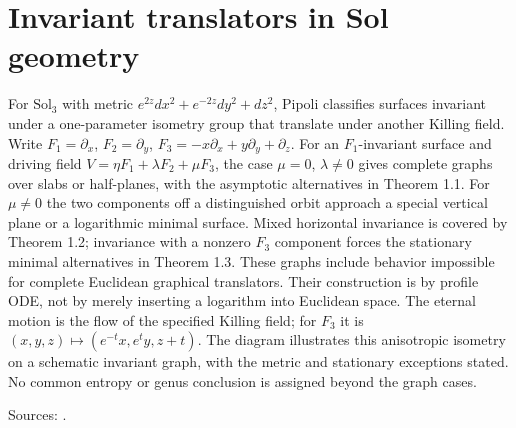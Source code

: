 \chapter{Invariant translators in Sol geometry}\label{sec:catalogue-sol-invariant-translators}
\begin{example}\label{ex:catalogue-sol-invariant-translators}
For $\mathrm{Sol}_3$ with metric $e^{2z}dx^2+e^{-2z}dy^2+dz^2$, Pipoli classifies surfaces invariant under a one-parameter isometry group that translate under another Killing field. Write $F_1=\partial_x$, $F_2=\partial_y$, $F_3=-x\partial_x+y\partial_y+\partial_z$. For an $F_1$-invariant surface and driving field $V=\eta F_1+\lambda F_2+\mu F_3$, the case $\mu=0$, $\lambda\ne0$ gives complete graphs over slabs or half-planes, with the asymptotic alternatives in Theorem 1.1. For $\mu\ne0$ the two components off a distinguished orbit approach a special vertical plane or a logarithmic minimal surface. Mixed horizontal invariance is covered by Theorem 1.2; invariance with a nonzero $F_3$ component forces the stationary minimal alternatives in Theorem 1.3.
These graphs include behavior impossible for complete Euclidean graphical translators. Their construction is by profile ODE, not by merely inserting a logarithm into Euclidean space. The eternal motion is the flow of the specified Killing field; for $F_3$ it is $(x,y,z)\mapsto(e^{-t}x,e^ty,z+t)$. The diagram illustrates this anisotropic isometry on a schematic invariant graph, with the metric and stationary exceptions stated. No common entropy or genus conclusion is assigned beyond the graph cases.
\par Sources: \cite{CatPipoli2019}.
\end{example}


